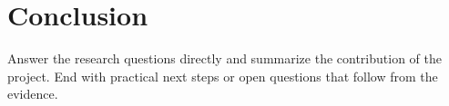 \chapter{Conclusion}

Answer the research questions directly and summarize the contribution of the project. End with practical next steps or open questions that follow from the evidence.
